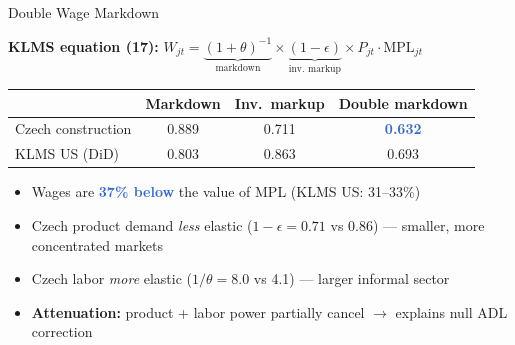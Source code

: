 \documentclass[aspectratio=169,11pt]{beamer}
\newcommand{\accenttext}[1]{\textcolor{accent}{\textbf{#1}}}
\newcommand{\highlighttext}[1]{\textcolor{highlight}{\textbf{#1}}}
\begin{document}
\begin{frame}{Double Wage Markdown}

\textbf{KLMS equation (17):} $W_{jt} = \underbrace{(1+\theta)^{-1}}_{\text{markdown}} \times \underbrace{(1-\epsilon)}_{\text{inv.\ markup}} \times P_{jt} \cdot \text{MPL}_{jt}$

\pause
\medskip
\begin{center}
\begin{tabular}{lccc}
\toprule
& Markdown & Inv.\ markup & \textbf{Double markdown} \\
\midrule
Czech construction & 0.889 & 0.711 & \highlighttext{0.632} \\
\textcolor{muted}{KLMS US (DiD)} & \textcolor{muted}{0.803} & \textcolor{muted}{0.863} & \textcolor{muted}{0.693} \\
\bottomrule
\end{tabular}
\end{center}

\pause
\medskip
\begin{itemize}
    \item Wages are \highlighttext{37\% below} the value of MPL (KLMS US: 31--33\%)
    \item Czech product demand \emph{less} elastic ($1{-}\epsilon = 0.71$ vs 0.86) --- smaller, more concentrated markets
    \item Czech labor \emph{more} elastic ($1/\theta = 8.0$ vs 4.1) --- larger informal sector
    \item \accenttext{Attenuation:} product + labor power partially cancel $\rightarrow$ explains null ADL correction
\end{itemize}

\end{frame}
\end{document}
